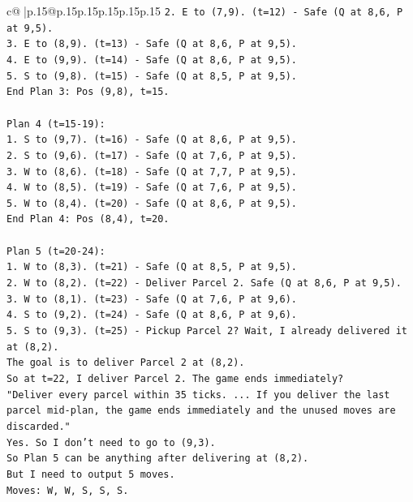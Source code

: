 \documentclass{article}
\begin{document}
{\begin{supertabular}{c@{$\;$}|p{.15\linewidth}@{}p{.15\linewidth}p{.15\linewidth}p{.15\linewidth}p{.15\linewidth}p{.15\linewidth}}
{{{\texttt{2. E to (7,9). (t=12) {-} Safe (Q at 8,6, P at 9,5).} \\
\texttt{3. E to (8,9). (t=13) {-} Safe (Q at 8,6, P at 9,5).} \\
\texttt{4. E to (9,9). (t=14) {-} Safe (Q at 8,6, P at 9,5).} \\
\texttt{5. S to (9,8). (t=15) {-} Safe (Q at 8,5, P at 9,5).} \\
\texttt{End Plan 3: Pos (9,8), t=15.} \\
\\ 
\texttt{Plan 4 (t=15{-}19):} \\
\texttt{1. S to (9,7). (t=16) {-} Safe (Q at 8,6, P at 9,5).} \\
\texttt{2. S to (9,6). (t=17) {-} Safe (Q at 7,6, P at 9,5).} \\
\texttt{3. W to (8,6). (t=18) {-} Safe (Q at 7,7, P at 9,5).} \\
\texttt{4. W to (8,5). (t=19) {-} Safe (Q at 7,6, P at 9,5).} \\
\texttt{5. W to (8,4). (t=20) {-} Safe (Q at 8,6, P at 9,5).} \\
\texttt{End Plan 4: Pos (8,4), t=20.} \\
\\ 
\texttt{Plan 5 (t=20{-}24):} \\
\texttt{1. W to (8,3). (t=21) {-} Safe (Q at 8,5, P at 9,5).} \\
\texttt{2. W to (8,2). (t=22) {-} Deliver Parcel 2. Safe (Q at 8,6, P at 9,5).} \\
\texttt{3. W to (8,1). (t=23) {-} Safe (Q at 7,6, P at 9,6).} \\
\texttt{4. S to (9,2). (t=24) {-} Safe (Q at 8,6, P at 9,6).} \\
\texttt{5. S to (9,3). (t=25) {-} Pickup Parcel 2? Wait, I already delivered it at (8,2).} \\
\texttt{The goal is to deliver Parcel 2 at (8,2).} \\
\texttt{So at t=22, I deliver Parcel 2. The game ends immediately?} \\
\texttt{"Deliver every parcel within 35 ticks. ... If you deliver the last parcel mid{-}plan, the game ends immediately and the unused moves are discarded."} \\
\texttt{Yes. So I don't need to go to (9,3).} \\
\texttt{So Plan 5 can be anything after delivering at (8,2).} \\
\texttt{But I need to output 5 moves.} \\
\texttt{Moves: W, W, S, S, S.} \\
}}}
\end{supertabular}}
\end{document}
